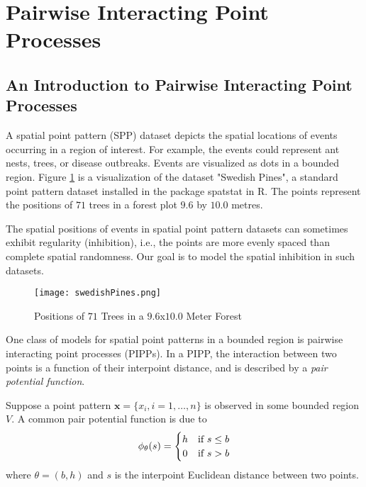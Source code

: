 \documentclass[12pt,openany]{article}
\renewcommand{\vec}[1]{\mathbf{#1}} %
\theoremstyle{remark} %
\theoremstyle{definition} %
\begin{document}

\newpage
\section{Pairwise Interacting Point Processes}
\subsection{An Introduction to Pairwise Interacting Point Processes}
A spatial point pattern (SPP) dataset depicts the spatial locations of events occurring in a region of interest. For example, the events could represent ant nests, trees, or disease outbreaks. Events are visualized as dots in a bounded region. Figure \ref{fig:swedishPines} is a visualization of the dataset "Swedish Pines", a standard point pattern dataset installed in the package \textsf{spatstat} in \textsf{R}. The points represent the positions of $71$ trees in a forest plot $9.6$ by $10.0$ metres. 

The spatial positions of events in spatial point pattern datasets can sometimes exhibit regularity (inhibition), i.e., the points are more evenly spaced than complete spatial randomness. Our goal is to model the spatial inhibition in such datasets. 

\begin{figure}

\begin{center}\texttt{[image: swedishPines.png]}\end{center}
\caption{Positions of $71$ Trees in a $9.6$x$10.0$ Meter Forest} \label{fig:swedishPines}

\end{figure}

One class of models for spatial point patterns in a bounded region is pairwise interacting point processes (PIPPs). In a PIPP, the interaction between two points is a function of their interpoint distance, and is described by a \textit{pair potential function}. 


Suppose a point pattern $\vec{x} = \{x_i, i = 1, \ldots, n\}$ is observed in some bounded region $V$. A common pair potential function is due to \citet{strauss} 
\[ 
\phi_\theta(s) = \left\{\def\arraystretch{1.2}%
  \begin{array}{@{}c@{\quad}l@{}}
    h & \text{if $s \le b$}\\
    0 & \text{if $s > b$}\\
  \end{array}\right.
\]
where $\theta = (b,h)$ and $s$ is the interpoint Euclidean distance between two points.
\end{document}
